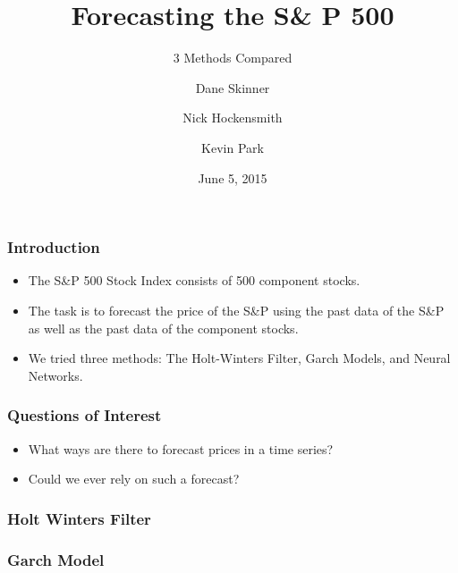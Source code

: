 \documentclass{beamer}
\title 
{Forecasting the S\& P 500}
\subtitle
{3 Methods Compared}
\author{Dane Skinner \and Nick Hockensmith \and Kevin Park}
\institute
{Oregon State University}
\date
{June 5, 2015}
\begin{document}
\begin{frame}
 \titlepage
\end{frame}


\begin{frame}
\frametitle{Introduction}
\begin{itemize}
\item The S\&P 500 Stock Index consists of 500 component stocks.
\item The task is to forecast the price of the S\&P using the past data of the S\&P as well as the past data of the component stocks.
\item We tried three methods: The Holt-Winters Filter, Garch Models, and Neural Networks.
\end{itemize}

\end{frame}


\begin{frame}
\frametitle{Questions of Interest}
\begin{itemize}
\item What ways are there to forecast prices in a time series?
\item Could we ever rely on such a forecast?
\end{itemize}
\end{frame}


\begin{frame}
\frametitle{Holt Winters Filter}

\end{frame}


\begin{frame}
\frametitle{Garch Model}
\begin{center}

\end{center}
\end{frame}

\end{document}
